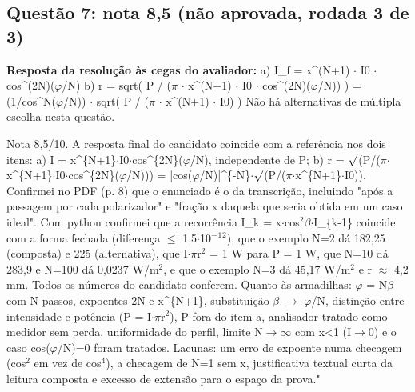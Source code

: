 \documentclass{article}%
\begin{document}
\subsection*{Questão 7: nota 8,5 (não aprovada, rodada 3 de 3)}%
\textbf{Resposta da resolução às cegas do avaliador:} a) I\_f = x\^{}(N+1) $\cdot$ I0 $\cdot$ cos\^{}(2N)($\varphi$/N)\newline%
\newline%
b) r = sqrt( P / ($\pi$ $\cdot$ x\^{}(N+1) $\cdot$ I0 $\cdot$ cos\^{}(2N)($\varphi$/N)) ) = (1/cos\^{}N($\varphi$/N)) $\cdot$ sqrt( P / ($\pi$ $\cdot$ x\^{}(N+1) $\cdot$ I0) )\newline%
\newline%
Não há alternativas de múltipla escolha nesta questão.\par %
Nota 8,5/10. A resposta final do candidato coincide com a referência nos dois itens: a) I = x\^{}\{N+1\}$\cdot$I0$\cdot$cos\^{}\{2N\}($\varphi$/N), independente de P; b) r = $\surd$(P/($\pi$$\cdot$x\^{}\{N+1\}$\cdot$I0$\cdot$cos\^{}\{2N\}($\varphi$/N))) = |cos($\varphi$/N)|\^{}\{{-}N\}$\cdot$$\surd$(P/($\pi$$\cdot$x\^{}\{N+1\}$\cdot$I0)). Confirmei no PDF (p. 8) que o enunciado é o da transcrição, incluindo "após a passagem por cada polarizador" e "fração x daquela que seria obtida em um caso ideal". Com python confirmei que a recorrência I\_k = x$\cdot$cos$^2$$\beta$$\cdot$I\_\{k{-}1\} coincide com a forma fechada (diferença $\leq$ 1,5$\cdot$10$^{-}$$^{1}$$^2$), que o exemplo N=2 dá 182,25 (composta) e 225 (alternativa), que I$\cdot$$\pi$r$^2$ = 1 W para P = 1 W, que N=10 dá 283,9 e N=100 dá 0,0237 W/m$^2$, e que o exemplo N=3 dá 45,17 W/m$^2$ e r $\approx$ 4,2 mm. Todos os números do candidato conferem. Quanto às armadilhas: $\varphi$ = N$\beta$ com N passos, expoentes 2N e x\^{}\{N+1\}, substituição $\beta$ $\to$ $\varphi$/N, distinção entre intensidade e potência (P = I$\cdot$$\pi$r$^2$), P fora do item a, analisador tratado como medidor sem perda, uniformidade do perfil, limite N$\to$$\infty$ com x<1 (I$\to$0) e o caso cos($\varphi$/N)=0 foram tratados. Lacunas: um erro de expoente numa checagem (cos$^2$ em vez de cos$^{4}$), a checagem de N=1 sem x, justificativa textual curta da leitura composta e excesso de extensão para o espaço da prova."%
\end{document}
